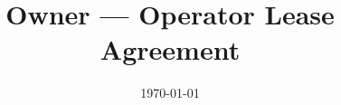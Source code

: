 
\title{Owner --- Operator Lease Agreement}
\author{\CarrierName}
\date{\today}


\makeatletter

    \renewcommand{\maketitle}{%
        \noindent%
        \begin{center}
            {%
                \LARGE%
                \bfseries%
                \scshape%
                \underline{\@title}
            } \\
            \vspace{0.5em}
            {
                \Large%
                \textbf{\@author}%
            }
            \vspace{1em}
        \end{center}
    }

\makeatother